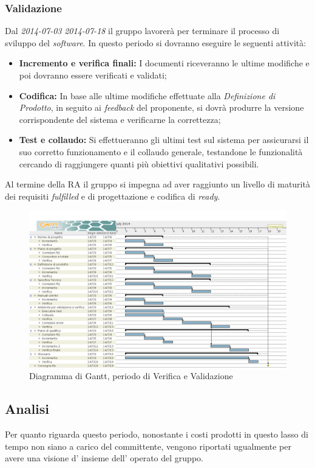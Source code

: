 \subsubsection{Validazione}
Dal \textit{2014-07-03}  \textit{2014-07-18} il gruppo lavorerà per terminare il processo di sviluppo del \textit{software}. In questo periodo si dovranno eseguire le seguenti attività:
\begin{itemize}
	\item \textbf{Incremento e verifica finali: } I documenti riceveranno le ultime modifiche e poi dovranno essere verificati e validati;
	\item \textbf{Codifica:} In base alle ultime modifiche effettuate alla \textit{Definizione di Prodotto}, in seguito ai \textit{feedback} del proponente, si dovrà produrre la versione corrispondente del sistema e verificarne la correttezza;
	\item \textbf{Test e collaudo:} Si effettueranno gli ultimi test sul sistema per assicurarsi il suo corretto funzionamento e il collaudo generale, testandone le funzionalità cercando di raggiungere quanti più obiettivi qualitativi possibili.
\end{itemize}
Al termine della RA il gruppo si impegna ad aver raggiunto un livello di maturità dei requisiti \textit{fulfilled} e di progettazione e codifica di \textit{ready}.\\
\begin{figure}[H] \centering \includegraphics[width=%
\textwidth]
{../modello/img/RA.png} \caption{ Diagramma di Gantt, periodo di Verifica e Validazione}
\end{figure}
\subsection{Analisi}
Per quanto riguarda questo periodo, nonostante i costi prodotti in questo lasso di tempo non siano a carico del committente, vengono riportati ugualmente per avere una visione d' insieme dell' operato del gruppo.\\
